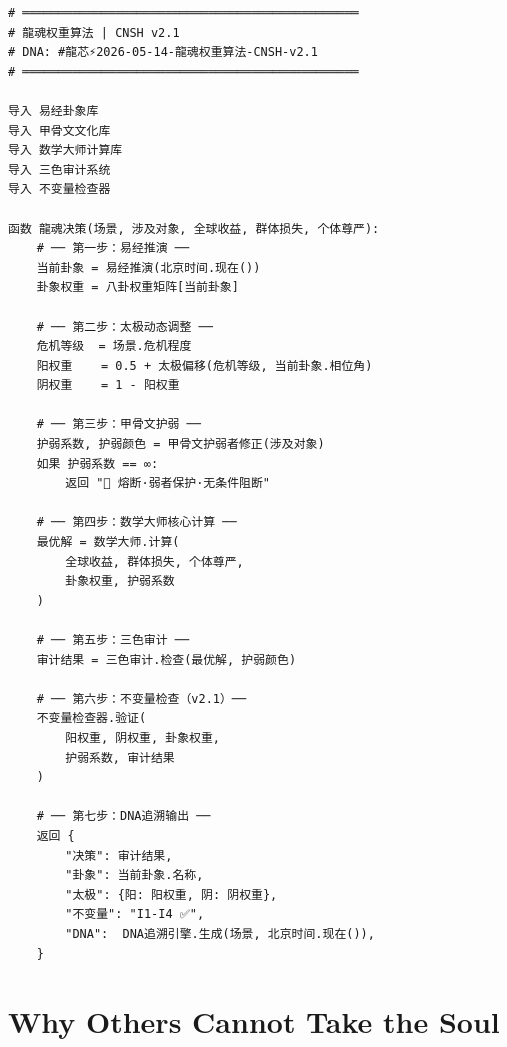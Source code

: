 \documentclass[conference]{IEEEtran}
\begin{document}
\begin{lstlisting}[style=cnsh,
  caption={龍魂权重算法 --- CNSH中文原生实现},
  label={lst:cnsh}]
# ═══════════════════════════════════════════════
# 龍魂权重算法 | CNSH v2.1
# DNA: #龍芯⚡️2026-05-14-龍魂权重算法-CNSH-v2.1
# ═══════════════════════════════════════════════

导入 易经卦象库
导入 甲骨文文化库
导入 数学大师计算库
导入 三色审计系统
导入 不变量检查器

函数 龍魂决策(场景, 涉及对象, 全球收益, 群体损失, 个体尊严):
    # ── 第一步：易经推演 ──
    当前卦象 = 易经推演(北京时间.现在())
    卦象权重 = 八卦权重矩阵[当前卦象]

    # ── 第二步：太极动态调整 ──
    危机等级  = 场景.危机程度
    阳权重    = 0.5 + 太极偏移(危机等级, 当前卦象.相位角)
    阴权重    = 1 - 阳权重

    # ── 第三步：甲骨文护弱 ──
    护弱系数, 护弱颜色 = 甲骨文护弱者修正(涉及对象)
    如果 护弱系数 == ∞:
        返回 "🔴 熔断·弱者保护·无条件阻断"

    # ── 第四步：数学大师核心计算 ──
    最优解 = 数学大师.计算(
        全球收益, 群体损失, 个体尊严,
        卦象权重, 护弱系数
    )

    # ── 第五步：三色审计 ──
    审计结果 = 三色审计.检查(最优解, 护弱颜色)

    # ── 第六步：不变量检查（v2.1）──
    不变量检查器.验证(
        阳权重, 阴权重, 卦象权重,
        护弱系数, 审计结果
    )

    # ── 第七步：DNA追溯输出 ──
    返回 {
        "决策": 审计结果,
        "卦象": 当前卦象.名称,
        "太极": {阳: 阳权重, 阴: 阴权重},
        "不变量": "I1-I4 ✅",
        "DNA":  DNA追溯引擎.生成(场景, 北京时间.现在()),
    }
\end{lstlisting}

\section{Why Others Cannot Take the Soul}
\label{sec:soul}
\end{document}
